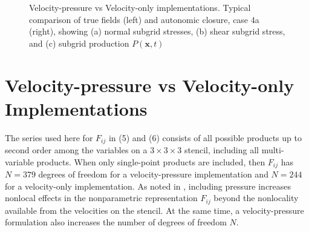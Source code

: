 %
\begin{figure}
	\centering %
	\label{F:CL28a}
\end{figure}
%
\begin{figure}
	\ContinuedFloat
	\centering %
	\label{F:CL28b}
\end{figure}
%
\begin{figure}
	\ContinuedFloat
	\centering %
	\label{F:CL28c}
\end{figure}
%
\begin{figure}
	\ContinuedFloat
	\caption{Velocity-pressure vs Velocity-only implementations. Typical comparison of  true fields (left) and autonomic closure, case 4a (right), showing (a) normal subgrid stresses, (b) shear subgrid stress, and (c) subgrid production $P(\mathbf{x},t)$}
	\label{F:CL28}
\end{figure}
%
%

\clearpage
\section{Velocity-pressure vs Velocity-only Implementations}
\label{sec:IVC}

The  series used here for $F_{ij}$  in (5) and (6) consists of all possible products up to second order among the variables on a  $3 \times 3 \times 3$ stencil, including all multi-variable products. When only single-point products are included, then $F_{ij}$  has $N = 379$ degrees of freedom for a velocity-pressure implementation and $N = 244$ for a velocity-only implementation. As noted in , including pressure increases nonlocal effects in the nonparametric representation $F_{ij}$  beyond the nonlocality available from the velocities on the stencil. At the same time, a velocity-pressure formulation also increases the number of degrees of freedom $N$. 


